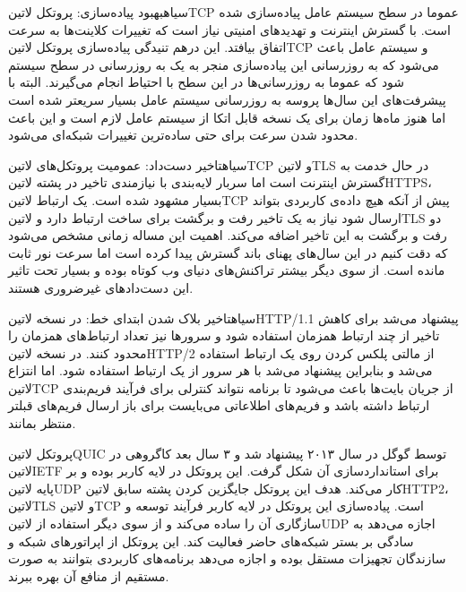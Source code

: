 ‌سیاه{بهبود پیاده‌سازی}: پروتکل ‌لاتین{TCP} عموما در سطح سیستم عامل پیاده‌سازی شده است. با گسترش اینترنت و تهدیدهای امنیتی نیاز است که تغییرات کلاینت‌ها به سرعت اتفاق بیافتد.
این درهم تنیدگی پیاده‌سازی پروتکل ‌لاتین{TCP} و سیستم عامل باعث می‌شود که به روزرسانی این پیاده‌سازی منجر به یک به روزرسانی در سطح سیستم شود که عموما به روزرسانی‌ها در این سطح
با احتیاط انجام می‌گیرند. البته با پیشرفت‌های این سال‌ها پروسه به روزرسانی سیستم عامل بسیار سریعتر شده است اما هنوز ماه‌ها زمان برای یک نسخه قابل اتکا از سیستم عامل لازم است و این باعث
محدود شدن سرعت برای حتی ساده‌ترین تغییرات شبکه‌ای می‌شود.

‌سیاه{تاخیر دست‌داد}: عمومیت پروتکل‌های ‌لاتین{TCP} و ‌لاتین{TLS} در حال خدمت به گسترش اینترنت است اما سربار لایه‌بندی با نیازمندی تاخیر در پشته ‌لاتین{HTTPS}،
بسیار مشهود شده است. یک ارتباط ‌لاتین{TCP} پیش از آنکه هیچ داده‌ی کاربردی بتواند ارسال شود نیاز به یک تاخیر رفت و برگشت برای ساخت ارتباط دارد و ‌لاتین{TLS} دو رفت و برگشت
به این تاخیر اضافه می‌کند. اهمیت این مساله زمانی مشخص می‌شود که دقت کنیم در این سال‌های پهنای باند گسترش پیدا کرده است اما سرعت نور ثابت مانده است. از سوی دیگر بیشتر تراکنش‌های دنیای وب
کوتاه بوده و بسیار تحت تاثیر این دست‌دادهای غیرضروری هستند.

‌سیاه{تاخیر بلاک شدن ابتدای خط}: در نسخه ‌لاتین{HTTP/1.1} پیشنهاد می‌شد برای کاهش تاخیر از چند ارتباط همزمان استفاده شود و سرورها نیز تعداد ارتباط‌های همزمان را محدود کنند.
در نسخه ‌لاتین{HTTP/2} از مالتی پلکس کردن روی یک ارتباط استفاده می‌شد و بنابراین پیشنهاد می‌شد با هر سرور از یک ارتباط استفاده شود.
اما انتزاع ‌لاتین{TCP} از جریان بایت‌ها باعث می‌شود تا برنامه نتواند کنترلی برای فرآیند فریم‌بندی ارتباط داشته باشد و فریم‌های اطلاعاتی می‌بایست برای باز ارسال فریم‌های قبلتر منتظر بمانند.

پروتکل ‌لاتین{QUIC} توسط گوگل در سال ۲۰۱۳ پیشنهاد شد و ۳ سال بعد کاگروهی در ‌لاتین{IETF} برای استانداردسازی آن شکل گرفت. این پروتکل در لایه کاربر بوده و بر پایه ‌لاتین{UDP} کار می‌کند.
هدف این پروتکل جایگزین کردن پشته سابق ‌لاتین{HTTP2}، ‌لاتین{TLS} و ‌لاتین{TCP} است.
پیاده‌سازی این پروتکل در لایه کاربر فرآیند توسعه و سازگاری آن را ساده می‌کند و از سوی دیگر استفاده از ‌لاتین{UDP} اجازه می‌دهد به سادگی بر بستر شبکه‌های حاضر فعالیت کند.
این پروتکل از اپراتورهای شبکه و سازندگان تجهیزات مستقل بوده و اجازه می‌دهد برنامه‌های کاربردی بتوانند به صورت مستقیم از منافع آن بهره ببرند.

